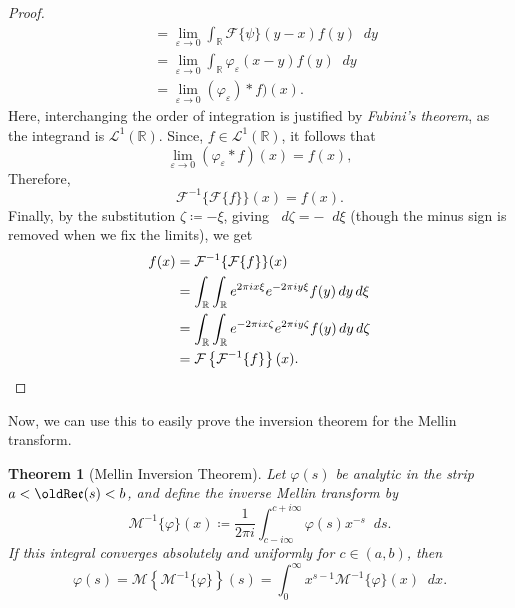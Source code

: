 \documentclass[a4paper]{article}
\newcommand*\diff{\mathop{}\!d} %
\newcommand{\R}{\mathbb{R}}
\renewcommand{\Re}{\mathop{\oldRe\mathfrak{e}}}
\newtheorem{theorem}{Theorem}
\theoremstyle{definition}
\begin{document}
\begin{proof}
\begin{align*}
                                                & = \lim_{\varepsilon \to 0} \int_\R \mathcal{F}\{\psi\}(y-x) f(y) \diff y                                                         \\
                                                & = \lim_{\varepsilon \to 0} \int_\R \varphi_\varepsilon (x-y) f(y) \diff y                                                        \\
                                                & = \lim_{\varepsilon \to 0} (\varphi_\varepsilon) * f)(x).
    \end{align*}
    Here, interchanging the order of integration is justified by \emph{Fubini's theorem}, as the integrand is $\mathcal{L}^1(\R)$.
    Since, $f \in \mathcal{L}^1(\R)$, it follows that
    \begin{equation*}
        \lim_{\varepsilon \to 0} (\varphi_\varepsilon * f)(x) = f(x),
    \end{equation*}
    Therefore,
    \begin{equation*}
        \mathcal{F}^{-1}\{\mathcal{F}\{f\}\}(x) = f(x).
    \end{equation*}
    Finally, by the substitution $\zeta \coloneq -\xi$, giving $\diff \zeta = -\diff \xi$ (though the minus sign is removed when we fix the limits), we get
    \begin{align*}
        f(x) & = \mathcal{F}^{-1}\{\mathcal{F}\{f\}\}(x)                                         \\
             & = \int_\R \int_\R e^{2\pi i x \xi} e^{-2\pi i y \xi} f(y) \diff y \diff \xi       \\
             & = \int_\R \int_\R e^{-2\pi i x \zeta} e^{2\pi i y \zeta} f(y) \diff y \diff \zeta \\
             & = \mathcal{F}\left\{\mathcal{F}^{-1}\{f\}\right\}(x). \qedhere
    \end{align*}
\end{proof}
Now, we can use this to easily prove the inversion theorem for the Mellin transform.
\begin{theorem}[Mellin Inversion Theorem]
    Let $\varphi(s)$ be analytic in the strip $a < \Re (s) < b$, and define the \emph{inverse Mellin transform} by
    \begin{equation}
        \mathcal{M}^{-1}\{\varphi\}(x) \coloneq \frac{1}{2\pi i} \int_{c-i\infty}^{c+i\infty} \varphi (s) x^{-s} \diff s.
    \end{equation}
    If this integral converges absolutely and uniformly for $c \in (a,b)$, then
    \begin{equation*}
        \varphi(s) = \mathcal{M}\left\{\mathcal{M}^{-1}\{\varphi\}\right\}(s) = \int_0^\infty x^{s-1} \mathcal{M}^{-1}\{\varphi\}(x) \diff x.
    \end{equation*}
\end{theorem}
\end{document}
